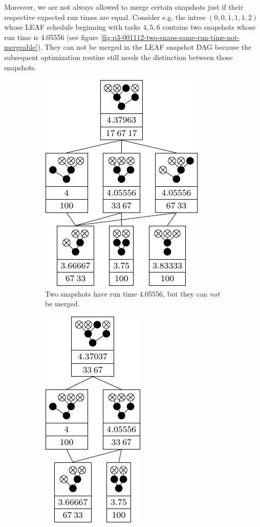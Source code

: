 Moreover, we are not always allowed to merge certain snapshots just if their respective expected run times are equal. Consider e.g. the intree $(0,0,1,1,1,2)$ whose LEAF schedule beginning with tasks $4, 5, 6$ contains two snapshots whose run time is 4.05556 (see figure \ref{fig:p3-001112-two-snaps-same-run-time-not-mergeable}). They can not be merged in the LEAF snapshot DAG because the subsequent optimization routine still needs the distinction between those snapshots.

\begin{figure}[th]
  \centering
  \begin{subfigure}{.45\textwidth}
    \centering{}
    \includegraphics{p3/001112_leaf.pdf}
    \caption{Two snapshots have run time 4.05556, but they can \emph{not} be merged.}
  \label{fig:p3-001112-two-snaps-same-run-time-not-mergeable-original}
  \end{subfigure}
  \quad
  \begin{subfigure}{.45\textwidth}
    \centering{}
    \includegraphics{p3/001112_leaf_opt.pdf}

\end{subfigure}
\end{figure}
